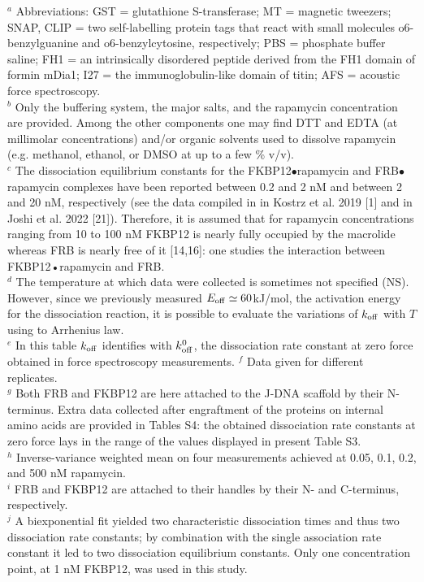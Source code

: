 \documentclass{biophys-new}
\begin{document}
\noindent
$^a$ Abbreviations: GST = glutathione S-transferase; MT = magnetic tweezers; SNAP, CLIP = two self-labelling protein tags that react with small molecules o6-benzylguanine and o6-benzylcytosine, respectively; PBS = phosphate buffer saline; FH1 = an intrinsically disordered peptide derived from the FH1 domain of formin mDia1; I27 = the immunoglobulin-like domain of titin; AFS = acoustic force spectroscopy.\\
$^b$ Only the buffering system, the major salts, and the rapamycin concentration are provided. Among the other components one may find DTT and EDTA (at millimolar concentrations) and/or organic solvents used to dissolve rapamycin (e.g. methanol, ethanol, or DMSO at up to a few \% v/v).\\
$^c$ The dissociation equilibrium constants for the FKBP12$\bullet$rapamycin and FRB$\bullet$rapamycin complexes have been reported between  0.2 and 2 nM and between 2 and 20 nM, respectively (see the data compiled in in Kostrz et al. 2019 [1] and in Joshi et al. 2022 [21]). %
Therefore, it is assumed that for rapamycin concentrations ranging from 10 to 100 nM FKBP12 is nearly fully occupied by the macrolide whereas FRB is nearly free of it [14,16]: one studies the interaction between FKBP12•rapamycin and FRB.\\
$^d$ The temperature at which data were collected is sometimes not specified (NS). However, since we previously measured $E_{\rm off} \simeq 60$kJ/mol, the activation energy for the dissociation reaction, it is possible to evaluate the variations of $k_{\rm off}$  with $T$ using to Arrhenius law.\\%
$^e$ In this table $k_{\rm off}$ identifies with $k^0_{\rm off}$, the dissociation rate constant at zero force obtained in force spectroscopy measurements.
$^f$ Data given for different replicates.\\
$^g$ Both FRB and FKBP12 are here attached to the J-DNA scaffold by their N-terminus. Extra data collected after engraftment of the proteins on internal amino acids are provided in Tables S4: the obtained dissociation rate constants at zero force lays in the range of the values displayed in present Table S3.\\
$^h$ Inverse-variance weighted mean on four measurements achieved at 0.05, 0.1, 0.2, and 500 nM rapamycin.\\
$^i$ FRB and FKBP12 are attached to their handles by their N- and C-terminus, respectively.\\
$^j$ A biexponential fit yielded two characteristic dissociation times and thus two dissociation rate constants; by combination with the single association rate constant it led to two dissociation equilibrium constants. Only one concentration point, at 1 nM FKBP12, was used in this study.\\
\end{document}
